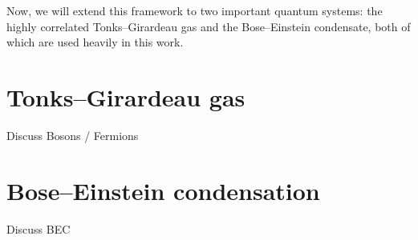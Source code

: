 Now, we will extend this framework to two important quantum systems: the highly correlated Tonks--Girardeau gas and the Bose--Einstein condensate, both of which are used heavily in this work.

\section{Tonks--Girardeau gas}

Discuss Bosons / Fermions

\section{Bose--Einstein condensation}

Discuss BEC
